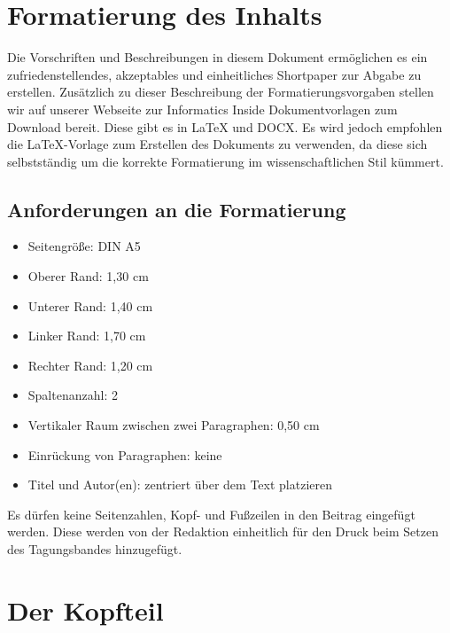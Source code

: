 {\section{Formatierung des Inhalts}
\label{chap:format}
Die Vorschriften und Beschreibungen in diesem Dokument ermöglichen es ein zufriedenstellendes, akzeptables und einheitliches Shortpaper zur Abgabe zu erstellen. Zusätzlich zu dieser Beschreibung der Formatierungsvorgaben stellen wir auf unserer Webseite zur Informatics Inside Dokumentvorlagen zum Download bereit. Diese gibt es in LaTeX und DOCX. Es wird jedoch empfohlen die LaTeX-Vorlage zum Erstellen des Dokuments zu verwenden, da diese sich selbstständig um die korrekte Formatierung im wissenschaftlichen Stil kümmert.


\subsection{Anforderungen an die Formatierung}
\label{ch:format:sec:Anforderungen an die Formatierung}

\begin{itemize}
\setlength{\itemsep}{0pt}
\setlength{\parsep}{0pt}
      \item Seitengröße: DIN A5
      \item Oberer Rand: 1,30 cm
      \item Unterer Rand: 1,40 cm
      \item Linker Rand: 1,70 cm
      \item Rechter Rand: 1,20 cm
      \item Spaltenanzahl: 2
      \item Vertikaler Raum zwischen zwei Paragraphen: 0,50 cm
      \item Einrückung von Paragraphen: keine
      \item Titel und Autor(en): zentriert über dem Text platzieren
   \end{itemize}
   
Es dürfen keine Seitenzahlen, Kopf- und Fußzeilen in den Beitrag eingefügt werden. Diese werden von der Redaktion einheitlich für den Druck beim Setzen des Tagungsbandes hinzugefügt.

\section{Der Kopfteil}
\label{chap:kopf}

}
